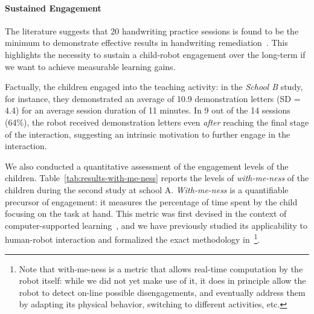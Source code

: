 \documentclass{article}
\begin{document}
\paragraph{Sustained Engagement}

The literature suggests that 20 handwriting practice sessions is found to be the
minimum to demonstrate effective results in handwriting
remediation~\cite{Hoy2011}. This highlights the necessity to sustain a
child-robot engagement over the long-term if we want to achieve measurable
learning gains.

Factually, the children engaged into the teaching activity: in the
\textit{School B} study, for instance, they demonstrated an average of 10.9
demonstration letters (SD = 4.4) for an average session duration of 11 minutes.
In 9 out of the 14 sessions (64\%), the robot received demonstration letters
even \emph{after} reaching the final stage of the interaction, suggesting an
intrinsic motivation to further engage in the interaction.


We also conducted a quantitative assessment of the engagement levels of the
children. Table~\ref{tab:results-with-me-ness} reports the levels of
\emph{with-me-ness} of the children during the second study at school A.
\emph{With-me-ness} is a quantifiable precursor of engagement: it measures the
percentage of time spent by the child focusing on the task at hand. This metric
was first devised in the context of computer-supported
learning~\cite{sharma2014me}, and we have previously studied its applicability
to human-robot interaction and formalized the exact methodology
in~\cite{lemaignan2016realtime}\footnote{Note that with-me-ness is a metric that
allows real-time computation by the robot itself: while we did not yet make
use of it, it does in principle allow the robot to detect on-line possible
disengagements, and eventually address them by adapting its physical
behavior, switching to different activities, etc.}.
\end{document}
